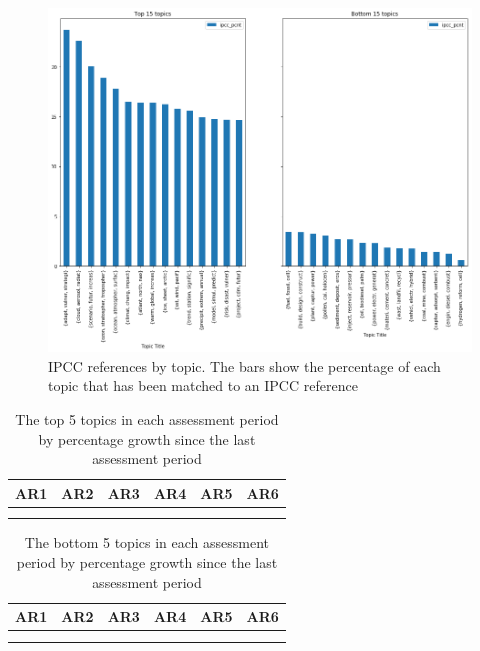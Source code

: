 \documentclass{article}
\begin{document}
\begin{figure}
	\includegraphics[width=\linewidth]{plots/ipcc_topics_65}
    \caption{IPCC references by topic. The bars show the percentage of each topic that has been matched to an IPCC reference}
    \label{IPCC}
\end{figure}

\begin{table}
\small
\setlength\tabcolsep{0.1cm}
\begin{tabular}{cccccc}
AR1 & AR2 & AR3 & AR4 & AR5 & AR6 \\
\midrule \\
 &   & 
 &   &   & 
\end{tabular}
\caption{The top 5 topics in each assessment period by percentage growth since the last assessment period}
\end{table}

\begin{table}
\small
\setlength\tabcolsep{0.1cm}
\begin{tabular}{cccccc}
AR1 & AR2 & AR3 & AR4 & AR5 & AR6 \\
\midrule \\
 &   & 
 &   &   & 
\end{tabular}
\caption{The bottom 5 topics in each assessment period by percentage growth since the last assessment period}
\end{table}
\end{document}
